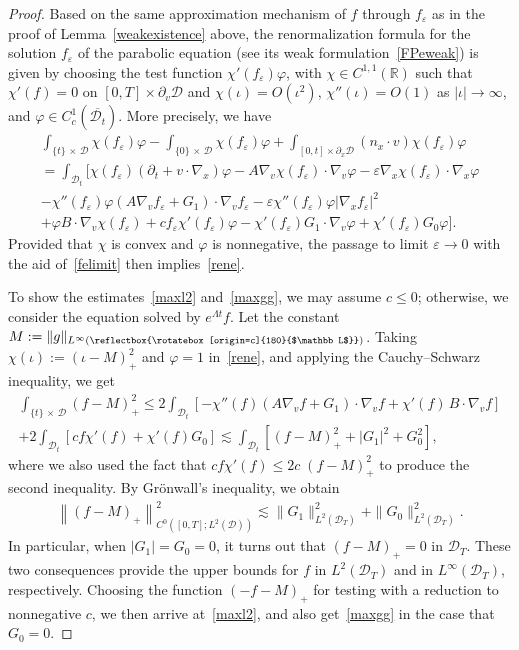 \documentclass[AHL,Unicode,longabstracts,published]{cedram}
\newcommand*\p{\partial}
\newcommand*\R {\mathbb{R}}
\newcommand*\D {\mathcal{D}}
\newcommand\GG{\reflectbox{\rotatebox[origin=c]{180}{$\mathbb L$}}}
\begin{document}
\begin{proof}
Based on the same approximation mechanism of $f$ through $f_\varepsilon$ as in the proof of Lemma~\ref{weakexistence} above, the renormalization formula for the solution $f_\varepsilon$ of the parabolic equation (see its weak formulation~\eqref{FPeweak}) is given by choosing the test function $\chi'(f_\varepsilon)\varphi$, with $\chi\in C^{1,1}(\R)$ such that $\chi'(f)=0$ on $[0,T]\times\p_v\D$ and $\chi(\iota)=O(\iota^2)$, $\chi''(\iota)=O(1)$ as $|\iota|\rightarrow\infty$, and $\varphi\in C_c^1(\overline{\D_t})$. More precisely, we have
\begin{multline*}
\int_{\{t\}\,\times\,\D}\chi(f_\varepsilon)\varphi-\int_{\{0\}\,\times\,\D}\chi(f_\varepsilon)\varphi + \int_{[0,t]\times\p_x\D} (n_x\cdot v) \chi(f_\varepsilon)\varphi \\
=\int_{\D_t} \big[\chi(f_\varepsilon)(\p_t+v\cdot\nabla_x)\varphi -A\nabla_v\chi(f_\varepsilon)\cdot\nabla_v\varphi -\varepsilon\nabla_x\chi(f_\varepsilon)\cdot\nabla_x\varphi\\
-\chi''(f_\varepsilon)\varphi (A\nabla_vf_\varepsilon+G_1)\cdot\nabla_vf_\varepsilon -\varepsilon\chi''(f_\varepsilon)\varphi
\left|\nabla_xf_\varepsilon\right|^2\\
+ \varphi B\cdot\nabla_v\chi(f_\varepsilon) + c f_\varepsilon\chi'(f_\varepsilon) \varphi -\chi'(f_\varepsilon)G_1\cdot\nabla_v\varphi + \chi'(f_\varepsilon)G_0\varphi\big].
\end{multline*}
Provided that $\chi$ is convex and $\varphi$ is nonnegative, the passage to limit $\varepsilon\rightarrow0$ with the aid of~\eqref{felimit} then implies~\eqref{rene}.

To show the estimates~\eqref{maxl2} and~\eqref{maxgg}, we may assume $c\le0$; otherwise, we consider the equation solved by $e^{\Lambda t}f$. Let the constant $M:=\|g\|_{L^\infty(\small\GG)}$. Taking $\chi(\iota):=(\iota-M)_+^2$ and $\varphi=1$ in~\eqref{rene}, and applying the Cauchy--Schwarz inequality, we get
\begin{multline*}
\int_{\{t\}\,\times\,\D}(f-M)_+^2
\le 2\int_{\D_t} \left[-\chi''(f)\left(A\nabla_vf+G_1\right)\cdot\nabla_vf + \chi'(f)\, B\cdot\nabla_vf\right]\\
+2\int_{\D_t} \left[c f\chi'(f) + \chi'(f)G_0\right]\lesssim \int_{\D_t}\left[(f-M)_+^2 +|G_1|^2 +G_0^2\right],
\end{multline*}
where we also used the fact that $cf\chi'(f)\le 2c\;\!(f-M)_+^2$ to produce the second inequality. By Gr\"onwall’s inequality, we obtain
\begin{align*}
\left\|(f-M)_+\right \|_{C^0\left([0,T];L^2(\D)\right)}^2
\lesssim \|G_1\|_{L^2(\D_T)}^2 +\|G_0\|_{L^2(\D_T)}^2.
\end{align*}
In particular, when $|G_1|=G_0=0$, it turns out that $(f-M)_+=0$ in $\D_T$. These two consequences provide the upper bounds for $f$ in $L^2(\D_T)$ and in $L^\infty(\D_T)$, respectively. Choosing the function $(-f-M)_+$ for testing with a reduction to nonnegative $c$, we then arrive at~\eqref{maxl2}, and also get~\eqref{maxgg} in the case that $G_0=0$.


\end{proof}
\end{document}
